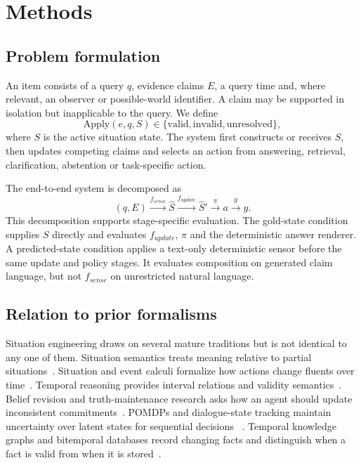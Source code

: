 \section*{Methods}

\subsection*{Problem formulation}

An item consists of a query $q$, evidence claims $E$, a query time and, where
relevant, an observer or possible-world identifier. A claim may be supported in
isolation but inapplicable to the query. We define
\begin{equation}
\mathrm{Apply}(e,q,S)\in\{\mathrm{valid},\mathrm{invalid},\mathrm{unresolved}\},
\end{equation}
where $S$ is the active situation state. The system first constructs or receives
$S$, then updates competing claims and selects an action from answering,
retrieval, clarification, abstention or task-specific action.

The end-to-end system is decomposed as
\begin{equation}
(q,E)\xrightarrow{f_{sense}}\hat S\xrightarrow{f_{update}}\hat S'
\xrightarrow{\pi}a\xrightarrow{g}y.
\end{equation}
This decomposition supports stage-specific evaluation. The gold-state condition
supplies $S$ directly and evaluates $f_{update}$, $\pi$ and the deterministic
answer renderer. A predicted-state condition applies a text-only deterministic
sensor before the same update and policy stages. It evaluates composition on
generated claim language, but not $f_{sense}$ on unrestricted natural language.

\subsection*{Relation to prior formalisms}

Situation engineering draws on several mature traditions but is not identical
to any one of them. Situation semantics treats meaning relative to partial
situations~\cite{barwise1983situations}. Situation and event calculi formalize
how actions change fluents over time~\cite{mccarthy1969problems,
kowalski1986event,reiter2001knowledge}. Temporal reasoning provides interval
relations and validity semantics~\cite{allen1983interval}. Belief revision and
truth-maintenance research asks how an agent should update inconsistent
commitments~\cite{alchourron1985logic,doyle1979truth}. POMDPs and dialogue-state
tracking maintain uncertainty over latent states for sequential decisions
~\cite{kaelbling1998pomdp,henderson2014second}. Temporal knowledge graphs and
bitemporal databases record changing facts and distinguish when a fact is valid
from when it is stored~\cite{snodgrass1992temporal}.

